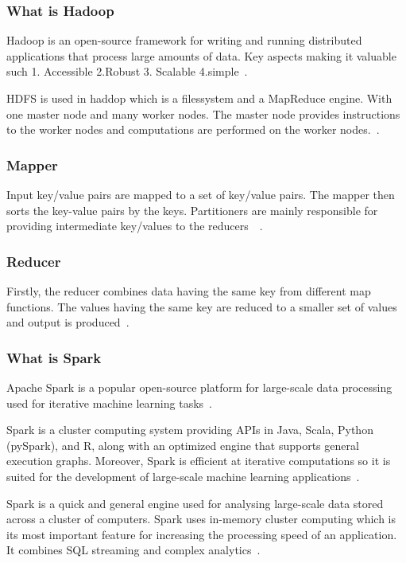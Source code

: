 \documentclass[]{final_report}
\begin{document}
\subsubsection{What is Hadoop}

Hadoop is an open-source framework for writing and running distributed applications that process large amounts of data.  Key aspects making it valuable such 1. Accessible 2.Robust 3. Scalable 4.simple~\cite{lam_hadoop_2010}.

HDFS is used in haddop which is a filessystem and a MapReduce engine. With one master node and many worker nodes. The master node provides instructions to the worker nodes and computations are performed on the worker nodes.~\cite{hazarika_performance_2017}.

\subsubsection{Mapper}
Input key/value pairs are mapped to a set of key/value pairs. The mapper then sorts the key-value pairs by the keys. Partitioners are mainly responsible for providing intermediate key/values to the reducers~\cite{patel_addressing_2012}~\cite{hazarika_performance_2017}.

\subsubsection{Reducer}

Firstly, the reducer combines data having the same key from different map functions. The values having the same key are reduced to a smaller set of values and output is produced~\cite{hazarika_performance_2017}.

\subsubsection{What is Spark}
Apache Spark is a popular open-source platform for large-scale data processing used for iterative machine learning tasks~\cite{meng_mllib_2016}.

Spark is a cluster computing system providing APIs in Java, Scala, Python (pySpark), and R, along with an optimized engine that supports general execution graphs. Moreover, Spark is efficient at iterative computations so it is suited for the development of large-scale machine learning applications~\cite{meng_mllib_2016}.

Spark is a quick and general engine used for analysing large-scale data stored across a cluster of computers. Spark uses in-memory cluster computing which is its most important feature for increasing the processing speed of an application. It combines SQL streaming and complex analytics~\cite{hazarika_performance_2017}.
\end{document}
